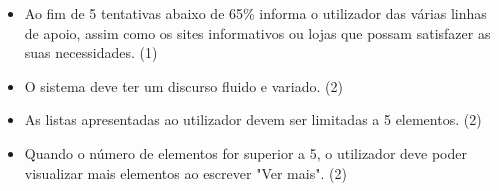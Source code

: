 \documentclass[11pt,a4paper]{article}
\newcommand{\requirement}[3]{
    #1 (#3)
}
\begin{document}
\begin{appendices}
\begin{itemize}
    \item \requirement{Ao fim de 5 tentativas abaixo de 65\% informa o utilizador das várias linhas de apoio, 
    assim como os sites informativos ou lojas que possam satisfazer as suas necessidades.}
    {Quando o sistema não consegue perceber o que o utilizador pretende consultar, pode ser melhor indicar outros meios
    de obter as informações pretendidas.}{1}
    \item \requirement{O sistema deve ter um discurso fluido e variado.}{O sistema deve simular a interação com um assistente humano.}{2}
    \item \requirement
    {As listas apresentadas ao utilizador devem ser limitadas a 5 elementos.}
    {A apresentação de listas de 5 elementos permite evitar o sobrecarregamento de informação.}{2}
    \item \requirement{Quando o número de elementos for superior a 5, o utilizador deve
    poder visualizar mais elementos ao escrever "Ver mais".}
    {O utilizador deve ser capaz de visualizar todos os elementos que pretender.}{2}
\end{itemize}


\end{appendices}
\end{document}
